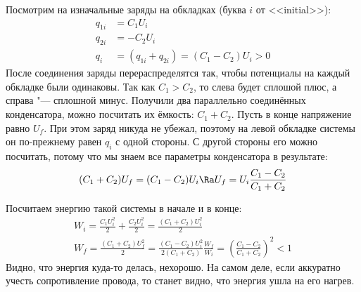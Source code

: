		Посмотрим на изначальные заряды на обкладках (буква $i$ от <<initial>>):
		\begin{align*}
			q_{1i} &= C_1 U_i \\
			q_{2i} &= -C_2 U_i \\
			q_i &= (q_{1i}+q_{2i}) = (C_1-C_2) U_i > 0
		\end{align*}
		После соединения заряды перераспределятся так, чтобы потенциалы на каждый обкладке были одинаковы.
		Так как $C_1>C_2$, то слева будет сплошой плюс, а справа "--- сплошной минус.
		Получили два параллельно соединённых конденсатора, можно посчитать их ёмкость: $C_1+C_2$.
		Пусть в конце напряжение равно $U_f$.
		При этом заряд никуда не убежал, поэтому на левой обкладке системы он по-прежнему равен $q_i$ с одной стороны.
		С другой стороны его можно посчитать, потому что мы знаем все параметры конденсатора в результате:
		\[ (C_1+C_2)U_f = (C_1-C_2)U_i \Ra U_f = U_i\frac{C_1-C_2}{C_1+C_2}\]

		Посчитаем энергию такой системы в начале и в конце:
		\begin{gather*}
		W_i = \frac{C_1U_i^2}{2} + \frac{C_2U_i^2}{2} = \frac{(C_1+C_2)U_i^2}{2} \\
		W_f = \frac{(C_1+C_2)U_f^2}{2} = \frac{(C_1-C_2)U_i^2}{2(C_1+C_2)}
		\frac{W_f}{W_i} = \left(\frac{C_1-C_2}{C_1+C_2}\right)^2 < 1
		\end{gather*}
		Видно, что энергия куда-то делась, нехорошо.
		На самом деле, если аккуратно учесть сопротивление провода, то станет видно, что энергия ушла на его нагрев.
